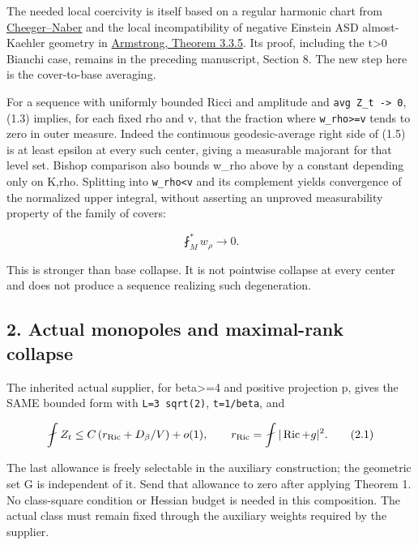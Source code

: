 \documentclass[
  10pt,
]{article}
\begin{document}
The needed local coercivity is itself based on a regular harmonic chart
from \href{https://arxiv.org/pdf/1406.6534}{Cheeger--Naber} and the
local incompatibility of negative Einstein ASD almost-Kaehler geometry
in
\href{https://johnarmstrongmaths.com/publications/resources/thesis.pdf}{Armstrong,
Theorem 3.3.5}. Its proof, including the t\textgreater0 Bianchi case,
remains in the preceding manuscript, Section 8. The new step here is the
cover-to-base averaging.

For a sequence with uniformly bounded Ricci and amplitude and
\texttt{avg\ Z\_t\ -\textgreater{}\ 0}, (1.3) implies, for each fixed
rho and v, that the fraction where \texttt{w\_rho\textgreater{}=v} tends
to zero in outer measure. Indeed the continuous geodesic-average right
side of (1.5) is at least epsilon at every such center, giving a
measurable majorant for that level set. Bishop comparison also bounds
w\_rho above by a constant depending only on K,rho. Splitting into
\texttt{w\_rho\textless{}v} and its complement yields convergence of the
normalized upper integral, without asserting an unproved measurability
property of the family of covers:

\[
                        \fint_M^{*} w_\rho\longrightarrow0. \tag{1.7}
\]

This is stronger than base collapse. It is not pointwise collapse at
every center and does not produce a sequence realizing such
degeneration.

\hypertarget{actual-monopoles-and-maximal-rank-collapse}{%
\subsection{2. Actual monopoles and maximal-rank
collapse}\label{actual-monopoles-and-maximal-rank-collapse}}

The inherited actual supplier, for beta\textgreater=4 and positive
projection p, gives the SAME bounded form with \texttt{L=3\ sqrt(2)},
\texttt{t=1/beta}, and

\[
 \fint Z_t\le C\left(r_{\rm Ric}+D_\beta/V\right)+o(1),
 \qquad r_{\rm Ric}=\fint|\operatorname{Ric}+g|^2.     \tag{2.1}
\]

The last allowance is freely selectable in the auxiliary construction;
the geometric set G is independent of it. Send that allowance to zero
after applying Theorem 1. No class-square condition or Hessian budget is
needed in this composition. The actual class must remain fixed through
the auxiliary weights required by the supplier.
\end{document}
